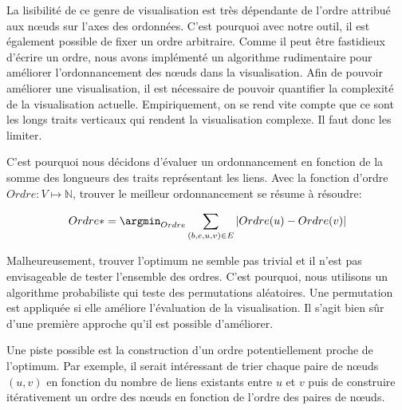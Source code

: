 La lisibilité de ce genre de visualisation est très dépendante de l'ordre attribué aux n\oe{}uds sur l'axes des ordonnées.
C'est pourquoi avec notre outil, il est également possible de fixer un ordre arbitraire.
Comme il peut être fastidieux d'écrire un ordre, nous avons implémenté un algorithme rudimentaire pour améliorer l'ordonnancement des n\oe{}uds dans la visualisation.
Afin de pouvoir améliorer une visualisation, il est nécessaire de pouvoir quantifier la complexité de la visualisation actuelle.
Empiriquement, on se rend vite compte que ce sont les longs traits verticaux qui rendent la visualisation complexe.
Il faut donc les limiter.

C'est pourquoi nous décidons d'évaluer un ordonnancement en fonction de la somme des longueurs des traits représentant les liens.
Avec la fonction d'ordre $Ordre: V \longmapsto \mathbb{N}$, trouver le meilleur ordonnancement se résume à résoudre:

\begin{equation}
 Ordre* = \argmin_{Ordre}  \sum_{(b,e,u,v) \in E} |Ordre(u)- Ordre(v)|
\end{equation}

Malheureusement, trouver l'optimum ne semble pas trivial et il n'est pas envisageable de tester l'ensemble des ordres.
C'est pourquoi, nous utilisons un algorithme probabiliste qui teste des permutations aléatoires.
Une permutation est appliquée si elle améliore l'évaluation de la visualisation.
Il s'agit bien sûr d'une première approche qu'il est possible d'améliorer.

Une piste possible est la construction d'un ordre potentiellement proche de l'optimum.
Par exemple, il serait intéressant de trier chaque paire de n\oe{}uds $(u,v)$ en fonction du nombre de liens existants entre $u$ et $v$ puis de construire itérativement un ordre des n\oe{}uds en fonction de l'ordre des paires de n\oe{}uds.
